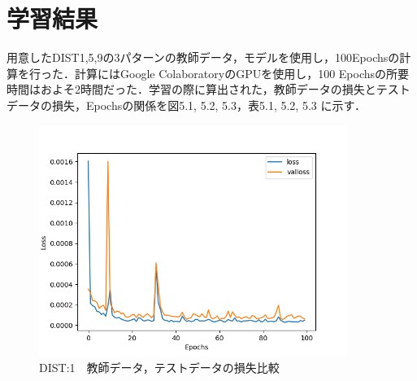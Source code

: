 \documentclass{jreport}		%
\begin{document}
\section{学習結果}
用意したDIST1,5,9の3パターンの教師データ，モデルを使用し，100Epochsの計算を行った．計算にはGoogle ColaboratoryのGPUを使用し，100 Epochsの所要時間はおよそ2時間だった．学習の際に算出された，教師データの損失とテストデータの損失，Epochsの関係を図5.1, 5.2, 5.3，表5.1, 5.2, 5.3 に示す．
\begin{figure}[htbp]
 \begin{center}
  \includegraphics[width=100mm]{gain1_loss_hikaku.png}
 \end{center}
 \caption{DIST:1　教師データ，テストデータの損失比較}
 \label{fig:one}
\end{figure}
\end{document}
